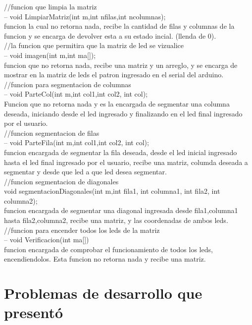 \documentclass{article}
\begin{document}
//funcion que limpia la matriz \\
-- void LimpiarMatriz(int m,int nfilas,int ncolumnas); \\
funcion la cual no retorna nada, recibe la cantidad de filas y columnas de la funcion y se encarga de devolver esta a su estado incial. (llenda de 0). \\

//la funcion que permitira que la matriz de led se vizualice \\
-- void imagen(int m,int ma[]); \\
funcion que no retorna nada, recibe una matriz y un arreglo, y se encarga de mostrar en la matriz de leds el patron ingresado en el serial del arduino. \\

//funcion para segmentacion de columnas \\
-- void ParteCol(int m,int col1,int col2, int col); \\
Funcion que no retorna nada y es la encargada de segmentar una columna deseada, iniciando desde el led ingresado y finalizando en el led final ingresado por el usuario. \\

//funcion segmentacion de filas \\
 -- void ParteFila(int m,int col1,int col2, int col); \\
funcion encargada de segmentar la fila deseada, desde el led inicial ingresado hasta el led final ingresado por el usuario, recibe una matriz, columda deseada a segmentar y desde que led a que led desea segmentar. \\

//funcion segmentacion de diagonales \\
void segmentacionDiagonales(int m,int fila1, int columna1, int fila2, int columna2); \\
funcion encargada de segmentar una diagonal ingresada desde fila1,columna1 hasta fila2,columna2, recibe una matriz, y las coordenadas de ambos leds. \\


//funcion para encender todos los leds de la matriz \\
-- void Verificacion(int ma[]) \\
funcion encargada de comprobar el funcionamiento de todos los leds, encendiendolos. Esta funcion no retorna nada y recibe una matriz. \\


\section{Problemas de desarrollo que presentó}\label{contenido}
\end{document}
